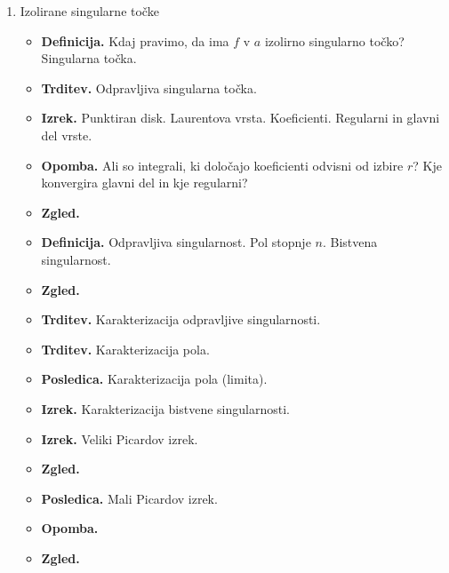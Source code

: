 \begin{enumerate}
    \item Izolirane singularne točke
    \begin{itemize}
        \item \textbf{Definicija.} Kdaj pravimo, da ima \(f\) v \(a\) izolirno singularno točko? Singularna točka.
        \item \textbf{Trditev.} Odpravljiva singularna točka.
        \item \textbf{Izrek.} Punktiran disk. Laurentova vrsta. Koeficienti. Regularni in glavni del vrste.
        \item \textbf{Opomba.} Ali so integrali, ki določajo koeficienti odvisni od izbire \(r\)? Kje konvergira glavni del in kje regularni?
        \item \textbf{Zgled.} 
        \item \textbf{Definicija.} Odpravljiva singularnost. Pol stopnje \(n\). Bistvena singularnost.
        \item \textbf{Zgled.} 
        \item \textbf{Trditev.} Karakterizacija odpravljive singularnosti.
        \item \textbf{Trditev.} Karakterizacija pola.
        \item \textbf{Posledica.} Karakterizacija pola (limita).
        \item \textbf{Izrek.} Karakterizacija bistvene singularnosti.
        \item \textbf{Izrek.} Veliki Picardov izrek.
        \item \textbf{Zgled.} \todo{}
        \item \textbf{Posledica.} Mali Picardov izrek.
        \item \textbf{Opomba.} 
        \item \textbf{Zgled.} \todo{} 
    \end{itemize}


\end{enumerate}
